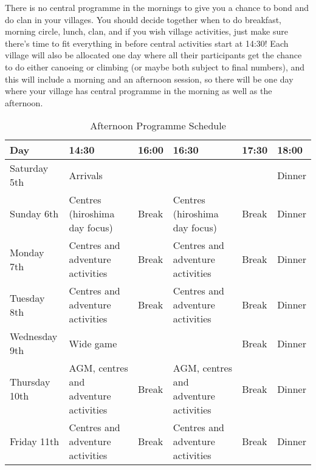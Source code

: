 \documentclass[a4paper, 11pt]{report}
\begin{document}
There is no central programme in the mornings to give you a chance to bond and do clan in your villages. You should decide together when to do breakfast, morning circle, lunch, clan, and if you wish village activities, just make sure there's time to fit everything in before central activities start at 14:30! Each village will also be allocated one day where all their participants get the chance to do either canoeing or climbing (or maybe both subject to final numbers), and this will include a morning and an afternoon session, so there will be one day where your village has central programme in the morning as well as the afternoon.
\begin{table}[H]
    \centering
    {\RaggedRight
    \begin{tabular}{p{} p{} p{} p{} p{} p{}}
        \textbf{Day} & \textbf{14:30} & \textbf{16:00} & \textbf{16:30} & \textbf{17:30} & \textbf{18:00} \\
        \hline
        Saturday 5th & \multicolumn{4}{l}{Arrivals} & Dinner \\
        \hline
        Sunday 6th & \cellcolor{wcfGreen}Centres (hiroshima day focus) & Break & \cellcolor{wcfGreen}Centres (hiroshima day focus) & Break & Dinner \\
        \hline
        Monday 7th & \cellcolor{wcfGreen}Centres and adventure activities & Break & \cellcolor{wcfGreen}Centres and adventure activities & Break & Dinner \\
        \hline
        Tuesday 8th & \cellcolor{wcfYellow}Centres and adventure activities & Break & \cellcolor{wcfYellow}Centres and adventure activities & Break & Dinner \\
        \hline
        Wednesday 9th & \multicolumn{3}{l}{\cellcolor{wcfYellow}Wide game} & Break & Dinner \\
        \hline
        Thursday 10th & \cellcolor{wcfRed}AGM, centres and adventure activities & Break & \cellcolor{wcfRed}AGM, centres and adventure activities & Break & Dinner \\
        \hline 
        Friday 11th & \cellcolor{wcfRed}Centres and adventure activities & Break & \cellcolor{wcfRed}Centres and adventure activities & Break & Dinner\\
        \hline
    \end{tabular}
    }%
    \caption{Afternoon Programme Schedule}
\end{table}
\end{document}
